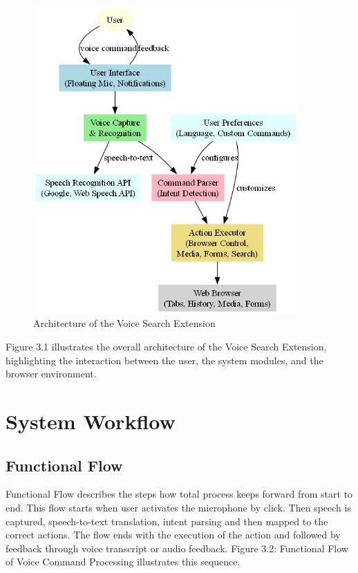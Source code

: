 \begin{figure}[H]
   \centering
   \includegraphics[width=4in]{latex/Chap3/system_architecture.png}
   \caption{Architecture of the Voice Search Extension}
   \label{fig:model}
\end{figure}
Figure 3.1 illustrates the overall architecture of the Voice Search Extension, highlighting the interaction between the user, the system modules, and the browser environment.


\section{System Workflow}
\subsection{Functional Flow}
Functional Flow describes the steps how total process keeps forward from start to end. This flow starts when user activates the microphone by click. Then speech is captured, speech-to-text translation, intent parsing and then mapped to the correct actions. The flow ends with the execution of the action and followed by feedback through voice transcript or audio feedback.
Figure 3.2: Functional Flow of Voice Command Processing illustrates this sequence.


